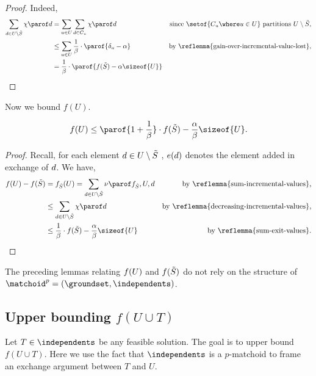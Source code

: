 \documentclass[oneside,letterpaper]{scrartcl} \usepackage{macros}
\begin{document}
\begin{proof}
  Indeed,
  \begin{align*}
    \sum_{\deleted \in \deleteds} \exitvalueof{\deleted} &= \sum_{\taken \in \takens} \sum_{\deleted \in
      \candidatesfor{\taken}} \exitvalueof{d} &\text{since } \setof{\candidatesfor{\taken} \where \taken \in
      \takens} \text{ partitions } \deleteds,\\
    &\leq \sum_{\taken \in \takens} \frac{1}{\beta}
    \cdot \parof{\gainof{\taken} -\alpha}&\text{by \reflemma{gain-over-incremental-value-lost},}\\
    &= \frac{1}{\beta} \cdot \parof{f(\finalset) - \alpha \sizeof{U}}
  \end{align*}
\end{proof}
Now we bound $f(U)$.
\begin{lemma}
  \begin{align*}
    f(U) \leq \parof{1 + \frac{1}{\beta}} \cdot f(\finalset) - \frac{\alpha}{\beta} \sizeof{U}.
  \end{align*}
\end{lemma}
\begin{proof}
  Recall, for each element $d \in U \setminus \tilde{S}$ ,
  $e(d)$ denotes the element added in exchange of
  $d$. We have,
  \begin{align*}
    f(U) - f(\finalset)&= f_{\finalset}(U) = \sum_{\deleted \in U \setminus \finalset} \incvalueof{f_{\finalset}}{U}{\deleted}
    &\text{by \reflemma{sum-incremental-values},} \\
    &\leq \sum_{\deleted \in U \setminus \finalset} \exitvalueof{\deleted} &\text{by \reflemma{decreasing-incremental-values},}\\
    &\leq \frac{1}{\beta} \cdot f(\finalset) -
    \frac{\alpha}{\beta}\sizeof{U}&\text{by \reflemma{sum-exit-values}.}
  \end{align*}
\end{proof}
\begin{remark}
  The preceding lemmas relating $f(U)$ and $f(\tilde{S})$ do not
  rely on the structure of $\defpmatchoid$.
\end{remark}
\subsection{Upper bounding $f(U \cup T)$}
 Let $T \in \independents$ be any feasible solution. The goal is to
upper bound $f(U \cup T)$. Here we use the fact that $\independents$
is a $p$-matchoid to frame an exchange argument between $T$ and $U$.
\end{document}
